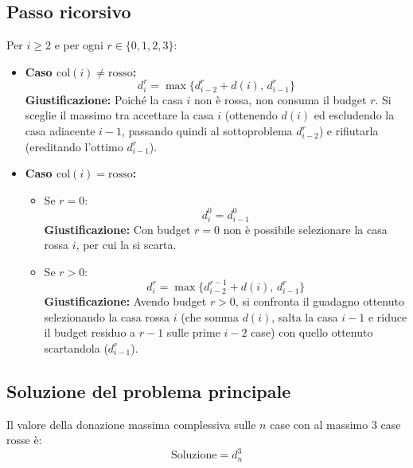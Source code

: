 \subsection{Passo ricorsivo}
Per $i \ge 2$ e per ogni $r \in \{0, 1, 2, 3\}$:
\begin{itemize}
    \item \textbf{Caso $\text{col}(i) \neq \text{rosso}$:}
    \[
        d_i^r = \max \{ d_{i-2}^r + d(i), \, d_{i-1}^r \}
    \]
    \textbf{Giustificazione:} Poiché la casa $i$ non è rossa, non consuma il budget $r$. Si sceglie il massimo tra accettare la casa $i$ (ottenendo $d(i)$ ed escludendo la casa adiacente $i-1$, passando quindi al sottoproblema $d_{i-2}^r$) e rifiutarla (ereditando l'ottimo $d_{i-1}^r$).

    \item \textbf{Caso $\text{col}(i) = \text{rosso}$:}
    \begin{itemize}
        \item Se $r = 0$:
        \[
            d_i^0 = d_{i-1}^0
        \]
        \textbf{Giustificazione:} Con budget $r = 0$ non è possibile selezionare la casa rossa $i$, per cui la si scarta.
        \item Se $r > 0$:
        \[
            d_i^r = \max \{ d_{i-2}^{r-1} + d(i), \, d_{i-1}^r \}
        \]
        \textbf{Giustificazione:} Avendo budget $r > 0$, si confronta il guadagno ottenuto selezionando la casa rossa $i$ (che somma $d(i)$, salta la casa $i-1$ e riduce il budget residuo a $r-1$ sulle prime $i-2$ case) con quello ottenuto scartandola ($d_{i-1}^r$).
    \end{itemize}
\end{itemize}

\subsection{Soluzione del problema principale}
Il valore della donazione massima complessiva sulle $n$ case con al massimo $3$ case rosse è:
\[
    \text{Soluzione} = d_n^3
\]

